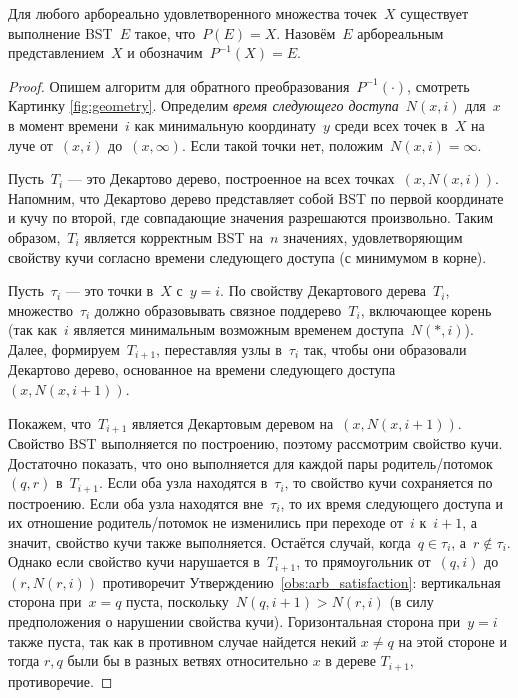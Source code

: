 \documentclass[a4paper,11pt]{article}
\begin{document}
\begin{lemma} \label{lemma:arboral_bst}
	Для любого арбореально удовлетворенного множества точек~$X$ существует выполнение BST~$E$ такое, что~$P(E) = X$. Назовём~$E$ арбореальным представлением~$X$ и обозначим~$P^{-1}(X) = E$.
\end{lemma}

\begin{proof}
	Опишем алгоритм для обратного преобразования~$P^{-1}(\cdot)$, смотреть Картинку \ref{fig:geometry}. 
Определим \emph{время следующего доступа}~$N(x, i)$ для~$x$ в момент времени~$i$ как минимальную координату~$y$ среди всех точек в~$X$ на луче от~$(x, i)$ до~$(x, \infty)$. Если такой точки нет, положим~$N(x, i) = \infty$.

Пусть~$T_i$ — это Декартово дерево, построенное на всех точках~$(x, N(x, i))$. Напомним, что Декартово дерево представляет собой BST по первой координате и кучу по второй, где совпадающие значения разрешаются произвольно. Таким образом,~$T_i$ является корректным BST на~$n$ значениях, удовлетворяющим свойству кучи согласно времени следующего доступа (с минимумом в корне).

Пусть~$\tau_i$ — это точки в~$X$ с~$y = i$. По свойству Декартового дерева~$T_i$, множество~$\tau_i$ должно образовывать связное поддерево~$T_i$, включающее корень (так как~$i$ является минимальным возможным временем доступа~$N(\ast, i)$). Далее, формируем~$T_{i+1}$, переставляя узлы в~$\tau_i$ так, чтобы они образовали Декартово дерево, основанное на времени следующего доступа~$(x, N(x, i+1))$. 

Покажем, что~$T_{i+1}$ является Декартовым деревом на~$(x, N(x, i+1))$. Свойство BST выполняется по построению, поэтому рассмотрим свойство кучи. Достаточно показать, что оно выполняется для каждой пары родитель/потомок~$(q, r)$ в~$T_{i + 1}$. 
Если оба узла находятся в~$\tau_i$, то свойство кучи сохраняется по построению. Если оба узла находятся вне~$\tau_i$, то их время следующего доступа и их отношение родитель/потомок не изменились при переходе от~$i$ к~$i+1$, а значит, свойство кучи также выполняется. Остаётся случай, когда~$q \in \tau_i$, а~$r \notin \tau_i$. Однако если свойство кучи нарушается в~$T_{i+1}$, то прямоугольник от~$(q, i)$ до~$(r, N(r, i))$ противоречит Утверждению~\ref{obs:arb_satisfaction}: вертикальная сторона при~$x = q$ пуста, поскольку~$N(q, i+1) > N(r, i)$ (в силу предположения о нарушении свойства кучи). 
Горизонтальная сторона при~$y = i$ также пуста, так как в противном случае найдется некий $x \neq  q$ на этой стороне и тогда $r, q$ были бы в разных ветвях относительно $x$ в дереве $T_{i + 1}$,  противоречие.
\end{proof}
\end{document}
